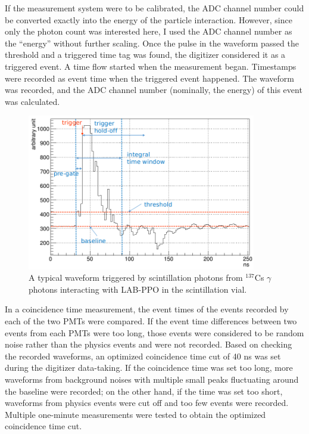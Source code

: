If the measurement system were to be calibrated, the ADC channel number could be converted exactly into the energy of the particle interaction. However, since only the photon count was interested here, I used the ADC channel number as the ``energy'' without further scaling. Once the pulse in the waveform passed the threshold and a triggered time tag was found, the digitizer considered it as a triggered event. A time flow started when the measurement began. Timestamps were recorded as event time when the triggered event happened. The waveform was recorded, and the ADC channel number (nominally, the energy) of this event was calculated.

\begin{figure}[htbp]
	\centering	
	\includegraphics[width=10cm]{teLS_waveform.png}
	\caption[A typical triggered waveform.]{A typical waveform triggered by scintillation photons from $^{137}$Cs $\gamma$ photons interacting with LAB-PPO in the scintillation vial.}
	\label{teLSwaveform}
\end{figure}

In a coincidence time measurement, the event times of the events recorded by each of the two PMTs were compared. If the event time differences between two events from each PMTs were too long, those events were considered to be random noise rather than the physics events and were not recorded. Based on checking the recorded waveforms, an optimized coincidence time cut of 40 ns was set during the digitizer data-taking. If the coincidence time was set too long, more waveforms from background noises with multiple small peaks fluctuating around the baseline were recorded; on the other hand, if the time was set too short, waveforms from physics events were cut off and too few events were recorded. Multiple one-minute measurements were tested to obtain the optimized coincidence time cut.

